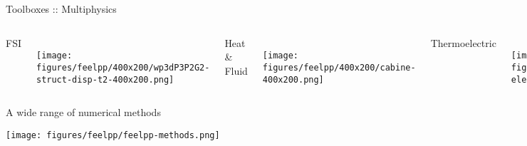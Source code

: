 \begin{frame}{Toolboxes :: Multiphysics}
  \begin{columns}[c]
    \centerline{\Large FSI}\\[.5cm]
    \texttt{[image: figures/feelpp/400x200/wp3dP3P2G2-struct-disp-t2-400x200.png]}
    \centerline{\Large Heat \& Fluid}\\[.5cm]
    \texttt{[image: figures/feelpp/400x200/cabine-400x200.png]}
    \centerline{\Large Thermoelectric}\\[.5cm]
    \texttt{[image: figures/feelpp/400x200/peltiermodule-electricpotential-400x200.png]}
  \end{columns}
\end{frame}

\begin{frame}{A wide range of numerical methods}
  \begin{center}
  \centerline{\texttt{[image: figures/feelpp/feelpp-methods.png]}}
  \end{center}

\end{frame}



